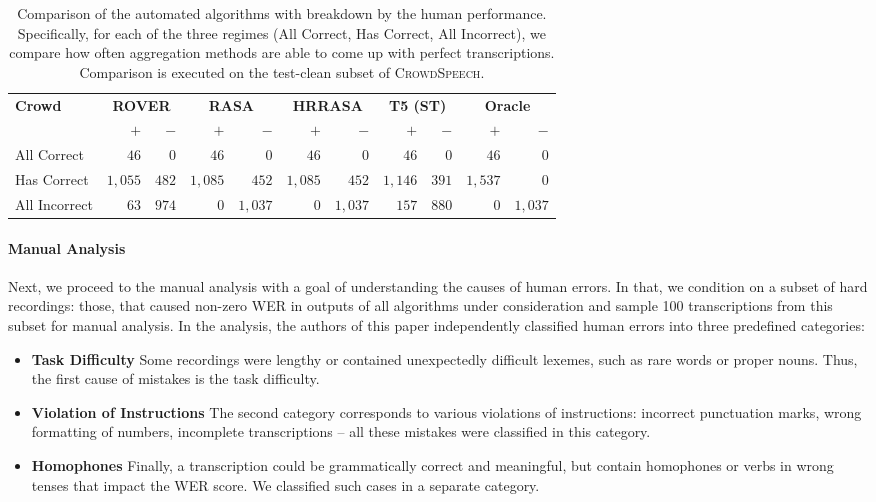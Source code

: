 \documentclass{article}
\newcommand{\speech}{\textsc{CrowdSpeech}}
\begin{document}
\begin{table}[t]
\centering
\caption{\label{tab:errors} Comparison of the automated algorithms with breakdown by the human performance. Specifically, for each of the three regimes (All Correct, Has Correct, All Incorrect), we compare how often aggregation methods are able to come up with perfect transcriptions. Comparison is executed on the test-clean subset of \speech{}.}
\begin{tabular}{l*{10}{r}}\toprule
\multirow{2}{*}{\textbf{Crowd}} & \multicolumn{2}{c}{\textbf{ROVER}} & \multicolumn{2}{c}{\textbf{RASA}} & \multicolumn{2}{c}{\textbf{HRRASA}} & \multicolumn{2}{c}{\textbf{T5 (ST)}} & \multicolumn{2}{c}{\textbf{Oracle}} \\
& $+$ & $-$ & $+$ & $-$ & $+$ & $-$ & $+$ & $-$ & $+$ & $-$ \\\cmidrule{2-11}
All Correct & $46$ & $0$ & $46$ & $0$ & $46$ & $0$ & $46$ & $0$ & $46$ & $0$ \\
Has Correct & $1,055$ & $482$ & $1,085$ & $452$ & $1,085$ & $452$ & $1,146$ & $391$ & $1,537$ & $0$ \\
All Incorrect & $63$ & $974$ & $0$ & $1,037$ & $0$ & $1,037$ & $157$ & $880$ & $0$ & $1,037$ \\\bottomrule 
\end{tabular}
\end{table}

\paragraph{Manual Analysis} Next, we proceed to the manual analysis with a goal of understanding the causes of human errors. In that, we condition on a subset of hard recordings: those, that caused non-zero WER in outputs of all algorithms under consideration and sample 100 transcriptions from this subset for manual analysis. In the analysis, the authors of this paper independently classified human errors into three predefined categories:
\begin{itemize}[itemsep=0pt, leftmargin=15pt, topsep=0pt]
    \item \textbf{Task Difficulty} Some recordings were lengthy or contained unexpectedly difficult lexemes, such as rare words or proper nouns. Thus, the first cause of mistakes is the task difficulty.
    
    \item \textbf{Violation of Instructions} The second category corresponds to various violations of instructions: incorrect punctuation marks, wrong formatting of numbers, incomplete transcriptions -- all these mistakes were classified in this category.

    \item \textbf{Homophones} Finally, a transcription could be grammatically correct and meaningful, but contain homophones or verbs in wrong tenses that impact the WER score. We classified such cases in a separate category.
\end{itemize}
\end{document}
